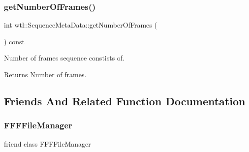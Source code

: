 \subsubsection{\texorpdfstring{get\+Number\+Of\+Frames()}{getNumberOfFrames()}}
{\footnotesize\ttfamily int wtl\+::\+Sequence\+Meta\+Data\+::get\+Number\+Of\+Frames (\begin{DoxyParamCaption}{ }\end{DoxyParamCaption}) const}



Number of frames sequence constists of. 

\begin{DoxyReturn}{Returns}
Number of frames. 
\end{DoxyReturn}


\subsection{Friends And Related Function Documentation}
\mbox{\label{classwtl_1_1_sequence_meta_data_a89f52b56f7155da8da3c26ad5feb1bcc}} 
\subsubsection{\texorpdfstring{F\+F\+F\+File\+Manager}{FFFFileManager}}
{\footnotesize\ttfamily friend class F\+F\+F\+File\+Manager\hspace{0.3cm}{\ttfamily [friend]}}

